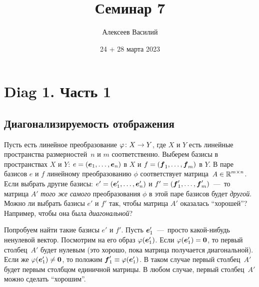 \documentclass[a4paper,12pt]{article}
\author{Алексеев Василий}
\title{Семинар 7}
\date{24 + 28 марта 2023}
\begin{document}
  \maketitle
  
  \tableofcontents

  \thispagestyle{empty}
  
  \newpage
  


  \section{Diag 1. Часть 1}
  
  \subsection{Диагонализируемость отображения}
  
  Пусть есть линейное преобразование $\phi\colon X \hm\to Y$, где $X$ и $Y$ есть линейные пространства размерностей~$n$ и $m$ соответственно.
  Выберем базисы в пространствах $X$ и $Y$: $e \hm= (\bds e_1, \ldots, \bds e_n)$ в $X$ и $f \hm= (\bds f_1, \ldots, \bds f_m)$ в $Y$.
  В паре базисов $e$ и $f$ линейному преобразованию $\phi$ соответствует матрица~$A \hm\in \RR^{m\times n}$.
  Если выбрать другие базисы: $e' = (\boldsymbol e_1', \ldots, \boldsymbol e_n')$ и $f' = (\boldsymbol f_1', \ldots, \boldsymbol f_m')$~---~то матрица $A'$ \emph{того же самого} преобразования $\phi$ в этой паре базисов будет \emph{другой}.
  Можно ли выбрать базисы $e'$ и $f'$ так, чтобы матрица $A'$ оказалась ``хорошей''?
  Например, чтобы она была \emph{диагональной}?
  
  Попробуем найти такие базисы $e'$ и $f'$.
  Пусть $\boldsymbol e_1'$~---~просто какой-нибудь ненулевой вектор.
  Посмотрим на его образ $\varphi(\boldsymbol e_1')$.
  Если $\phi(\bds e_1') \hm= \bds 0$, то первый столбец~$A'$ будет нулевым (это хорошо, пока матрица получается диагональной).
  Если же $\phi(\bds e_1') \hm{\not=} \bds 0$, то положим $\bds f_1' \hm\equiv \phi(\bds e_1')$.
  В таком случае первый столбец~$A'$ будет первым столбцом единичной матрицы.
  В любом случае, первый столбец~$A'$ можно сделать ``хорошим''.
  
\end{document}
